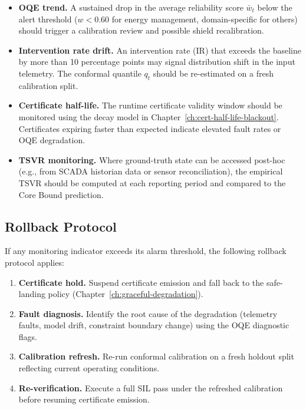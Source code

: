 \begin{itemize}
  \item \textbf{OQE trend.}  A sustained drop in the average reliability
    score $\bar{w}_t$ below the alert threshold ($w < 0.60$ for energy
    management, domain-specific for others) should trigger a calibration
    review and possible shield recalibration.

  \item \textbf{Intervention rate drift.}  An intervention rate (IR) that
    exceeds the baseline by more than 10 percentage points may signal
    distribution shift in the input telemetry.  The conformal quantile
    $q_t$ should be re-estimated on a fresh calibration split.

  \item \textbf{Certificate half-life.}  The runtime certificate validity
    window should be monitored using the decay model in
    Chapter~\ref{ch:cert-half-life-blackout}.  Certificates expiring faster
    than expected indicate elevated fault rates or OQE degradation.

  \item \textbf{TSVR monitoring.}  Where ground-truth state can be accessed
    post-hoc (e.g., from SCADA historian data or sensor reconciliation),
    the empirical TSVR should be computed at each reporting period and
    compared to the Core Bound prediction.
\end{itemize}

\subsection{Rollback Protocol}

If any monitoring indicator exceeds its alarm threshold, the following
rollback protocol applies:

\begin{enumerate}
  \item \textbf{Certificate hold.}  Suspend certificate emission and fall
    back to the safe-landing policy (Chapter~\ref{ch:graceful-degradation}).
  \item \textbf{Fault diagnosis.}  Identify the root cause of the degradation
    (telemetry faults, model drift, constraint boundary change) using the
    OQE diagnostic flags.
  \item \textbf{Calibration refresh.}  Re-run conformal calibration on a
    fresh holdout split reflecting current operating conditions.
  \item \textbf{Re-verification.}  Execute a full SIL pass under the refreshed
    calibration before resuming certificate emission.
\end{enumerate}


